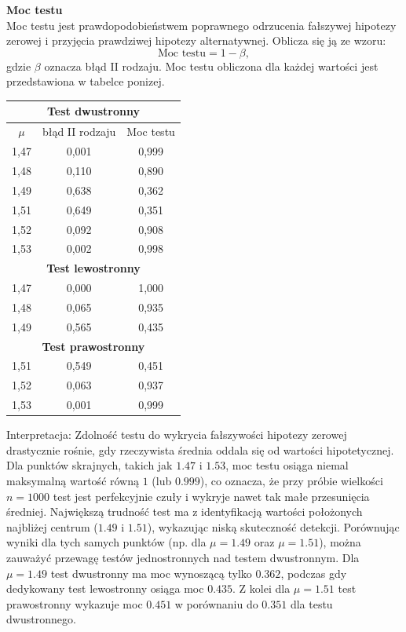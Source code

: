 \documentclass[12pt, a4paper]{article}
\begin{document}
		\textbf{Moc testu} \\
		Moc testu jest prawdopodobieństwem poprawnego odrzucenia fałszywej hipotezy zerowej i przyjęcia prawdziwej hipotezy alternatywnej. Oblicza się ją ze wzoru: $$\text{Moc testu} = 1 - \beta, $$ gdzie $\beta$ oznacza błąd II rodzaju. Moc testu obliczona dla każdej wartości jest przedstawiona w tabelce ponizej.
		\newpage
		\begin{table}[htbp]
			\centering
			\begin{tabular}{|c|c|c|}
				\hline
				\multicolumn{3}{|c|}{\textbf{Test dwustronny}} \\ \hline
				$\mu$ & błąd II rodzaju & Moc testu \\ \hline
				1,47 & 0,001 & 0,999 \\ \hline
				1,48 & 0,110 & 0,890 \\ \hline
				1,49 & 0,638 & 0,362 \\ \hline
				1,51 & 0,649 & 0,351 \\ \hline
				1,52 & 0,092 & 0,908 \\ \hline
				1,53 & 0,002 & 0,998 \\ \hline
				\multicolumn{3}{|c|}{\textbf{Test lewostronny}} \\ \hline
				1,47 & 0,000 & 1,000 \\ \hline
				1,48 & 0,065 & 0,935 \\ \hline
				1,49 & 0,565 & 0,435 \\ \hline
				\multicolumn{3}{|c|}{\textbf{Test prawostronny}} \\ \hline
				1,51 & 0,549 & 0,451 \\ \hline
				1,52 & 0,063 & 0,937 \\ \hline
				1,53 & 0,001 & 0,999 \\ \hline
			\end{tabular}
		\end{table}
		
		Interpretacja: Zdolność testu do wykrycia fałszywości hipotezy zerowej drastycznie rośnie, gdy rzeczywista średnia oddala się od wartości hipotetycznej. Dla punktów skrajnych, takich jak $1.47$ i $1.53$, moc testu osiąga niemal maksymalną wartość równą $1$ (lub $0.999$), co oznacza, że przy próbie wielkości $n = 1000$ test jest perfekcyjnie czuły i wykryje nawet tak małe przesunięcia średniej. Największą trudność test ma z identyfikacją wartości położonych najbliżej centrum ($1.49$ i $1.51$), wykazując niską skuteczność detekcji. Porównując wyniki dla tych samych punktów (np. dla $\mu = 1.49$ oraz $\mu = 1.51$), można zauważyć przewagę testów jednostronnych nad testem dwustronnym. Dla $\mu = 1.49$ test dwustronny ma moc wynoszącą tylko $0.362$, podczas gdy dedykowany test lewostronny osiąga moc $0.435$. Z kolei dla $\mu = 1.51$ test prawostronny wykazuje moc $0.451$ w porównaniu do $0.351$ dla testu dwustronnego.
\end{document}

